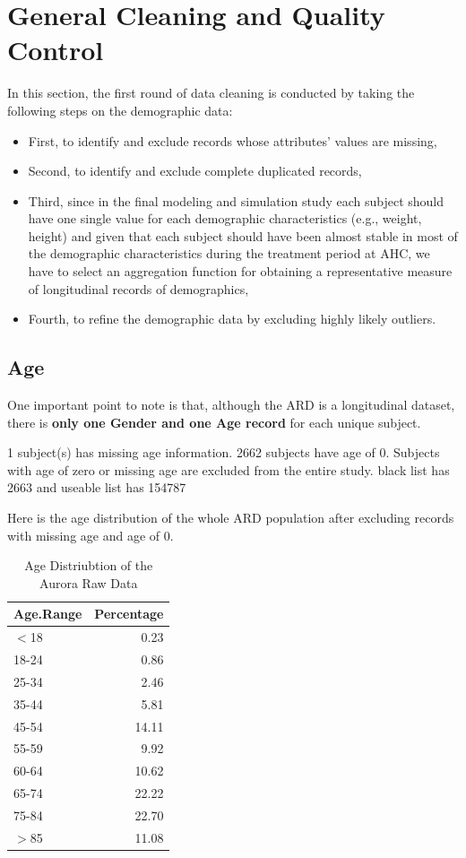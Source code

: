 \documentclass{article}
\begin{document}
\section{General Cleaning and Quality Control}
In this section, the first round of data cleaning is conducted by taking the following steps on the demographic data: 
\begin{itemize}
  \item First, to identify and exclude records whose attributes' values are missing,
  \item Second, to identify and exclude complete duplicated records,
  \item Third, since in the final modeling and simulation study each subject should have one single value for each demographic characteristics (e.g., weight, height) and given that each subject should have been almost stable in most of the demographic characteristics during the treatment period at AHC, we have to select an aggregation function for obtaining a representative measure of longitudinal records of demographics,
  \item Fourth, to refine the demographic data by excluding highly likely outliers.
\end{itemize}

\subsection{Age}
One important point to note is that, although the ARD is a longitudinal  dataset, there is \textbf{only one Gender and one Age record} for each unique subject.

1 subject(s) has missing age information. 2662 subjects have age of 0. Subjects with age of zero or missing age are excluded from the entire study. black list has 2663 and useable list has 154787

Here is the age distribution of the whole ARD population after excluding records with missing age and age of 0.

\begin{table}[ht]
\centering
\begin{tabular}{lr}
  \hline
Age.Range & Percentage \\ 
  \hline
$<$18 & 0.23 \\ 
  18-24 & 0.86 \\ 
  25-34 & 2.46 \\ 
  35-44 & 5.81 \\ 
  45-54 & 14.11 \\ 
  55-59 & 9.92 \\ 
  60-64 & 10.62 \\ 
  65-74 & 22.22 \\ 
  75-84 & 22.70 \\ 
  $>$85 & 11.08 \\ 
   \hline
\end{tabular}
\caption{Age Distriubtion of the Aurora Raw Data} 
\label{Table:3}
\end{table}
\end{document}
